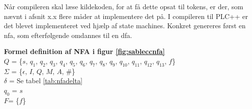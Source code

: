 




\noindent Når compileren skal læse kildekoden, for at få dette opsat til tokens, er der, som nævnt i afsnit x.x flere måder at implementere det på. I compileren til PLC++ er det blevet implementeret ved hjælp af state machines. Konkret genereres først en \gls{nfa}, som efterfølgende omdannes til en \gls{dfa}.


\noindent \textbf{Formel definition af NFA i figur \ref{fig:sableccnfa}}\\
\noindent $Q$ = \{$s$, $q_1$, $q_2$, $q_3$, $q_4$, $q_5$, $q_6$, $q_7$, $q_8$, $q_9$, $q_{10}$, $q_{11}$, $q_{12}$, $q_{13}$, $f$\}\\
\noindent $\Sigma$ = \{$\epsilon$, $I$, $Q$, $M$, $A$, $\#$\}\\
\noindent $\delta$ = Se tabel \ref{tab:nfadelta}\\
\noindent $q_0$ = $s$\\
\noindent $F$= \{$f$\}\\


